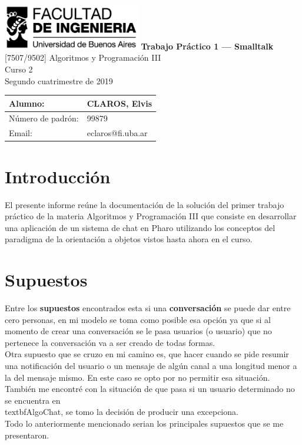 \documentclass[titlepage,a4paper]{article}
\begin{document}
\begin{titlepage} %
	\hfill\includegraphics[width=6cm]{logofiuba.jpg}
    \centering
    \vfill
    \Huge \textbf{Trabajo Práctico 1 — Smalltalk}
    \vskip2cm
    \Large [7507/9502] Algoritmos y Programación III\\
    Curso 2 \\ %
    Segundo cuatrimestre de 2019 
    \vfill
    \begin{tabular}{ | l | l | } %
      \hline
      Alumno: & CLAROS, Elvis \\ \hline
      Número de padrón: & 99879 \\ \hline
      Email: & eclaros@fi.uba.ar \\ \hline
  	\end{tabular}
    \vfill
    \vfill
\end{titlepage}

\tableofcontents %
\newpage

\section{Introducción}\label{sec:intro}
El presente informe reúne la documentación de la solución del primer trabajo práctico de la materia Algoritmos y Programación III que consiste en desarrollar una aplicación de un sistema de chat en Pharo utilizando los conceptos del paradigma de la orientación a objetos vistos hasta ahora en el curso.

\section{Supuestos}\label{sec:supuestos}

Entre los \textbf{supuestos} encontrados esta si una \textbf{conversación} se puede dar entre cero personas, en mi modelo se toma como posible esa opción ya que si al momento de crear una conversación se le pasa usuarios (o usuario) que no pertenece la conversación va a ser creado de todas formas.\\Otra supuesto que se cruzo en mi camino es, que hacer cuando se pide resumir una notificación del usuario o un mensaje de algún canal a una longitud menor a la del mensaje mismo. En este caso se opto por no permitir esa situación.\\
También me encontré con la situación de que pasa si un usuario determinado no se encuentra en \\textbf{AlgoChat}, se tomo la decisión de producir una excepciona.\\ Todo lo anteriormente mencionado serian los principales supuestos que se me presentaron.
\end{document}
